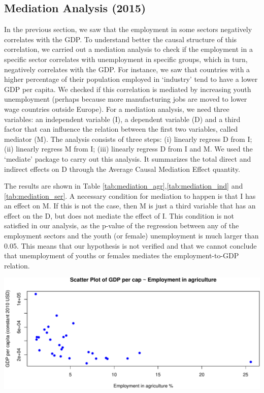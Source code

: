 \documentclass[
]{article}
\begin{document}
\hypertarget{mediation-analysis-2015}{%
\subsection{Mediation Analysis (2015)}\label{mediation-analysis-2015}}

In the previous section, we saw that the employment in some sectors
negatively correlates with the GDP. To understand better the causal
structure of this correlation, we carried out a mediation analysis to
check if the employment in a specific sector correlates with
unemployment in specific groups, which in turn, negatively correlates
with the GDP. For instance, we saw that countries with a higher
percentage of their population employed in `industry' tend to have a
lower GDP per capita. We checked if this correlation is mediated by
increasing youth unemployment (perhaps because more manufacturing jobs
are moved to lower wage countries outside Europe). For a mediation
analysis, we need three variables: an independent variable (I), a
dependent variable (D) and a third factor that can influence the
relation between the first two variables, called mediator (M). The
analysis consists of three steps: (i) linearly regress D from I; (ii)
linearly regress M from I; (iii) linearly regress D from I and M. We
used the `mediate' package to carry out this analysis. It summarizes the
total direct and indirect effects on D through the Average Causal
Mediation Effect quantity.

The results are shown in Table
\ref{tab:mediation_agr},\ref{tab:mediation_ind} and
\ref{tab:mediation_ser}. A necessary condition for mediation to happen
is that I has an effect on M. If this is not the case, then M is just a
third variable that has an effect on the D, but does not mediate the
effect of I. This condition is not satisfied in our analysis, as the
p-value of the regression between any of the employment sectors and the
youth (or female) unemployment is much larger than 0.05. This means that
our hypothesis is not verified and that we cannot conclude that
unemployment of youths or females mediates the employment-to-GDP
relation.

\includegraphics{main_files/figure-latex/mediation_agr-1.pdf}
\end{document}
